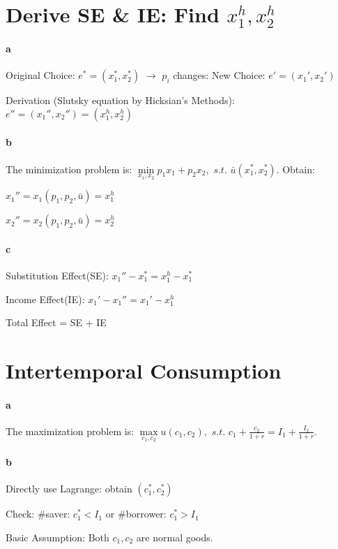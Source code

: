 \documentclass{article} %
\begin{document}
\section{Derive SE \& IE: Find $x_1^h, x_2^h$}

\paragraph{a}
    Original Choice: $e^*=(x_1^*, x_2^*)$ $\rightarrow$ $p_i$ changes: New Choice: $e'=(x_1', x_2')$
    
    Derivation (Slutsky equation by Hicksian's Methods): $e''=(x_1'', x_2'') = (x_1^h, x_2^h)$
    
\paragraph{b}
    The minimization problem is: $\mathop{min}\limits_{x_1,x_2} p_1x_1+p_2x_2,$  $s.t.$  $ \bar{u}(x_1^*,x_2^*)$. Obtain: 

    $x_1''=x_1(p_1,p_2,\bar{u})=x_1^h$
    
    $x_2''=x_2(p_1,p_2,\bar{u})=x_2^h$
    
\paragraph{c}
    Substitution Effect(SE): $x_1''-x_1^* = x_1^h -x_1^*$
    
    Income Effect(IE): $x_1'-x_1'' = x_1' -x_1^h$
    
    Total Effect = SE + IE
    \\    
\section{Intertemporal Consumption}

\paragraph{a}
    The maximization problem is: $\mathop{max}\limits_{c_1,c_2} u(c_1,c_2),$  $s.t.$  $c_1+\frac{c_2}{1+r}=I_1+\frac{I_2}{1+r}$.
\paragraph{b}
    Directly use Lagrange: obtain $(c_1^*, c_2^*)$
    
    Check: \#saver: $c_1^* < I_1$ or \#borrower: $c_1^* > I_1$
    
    Basic Assumption: Both $c_1, c_2$ are normal goods. 
    
\end{document}
